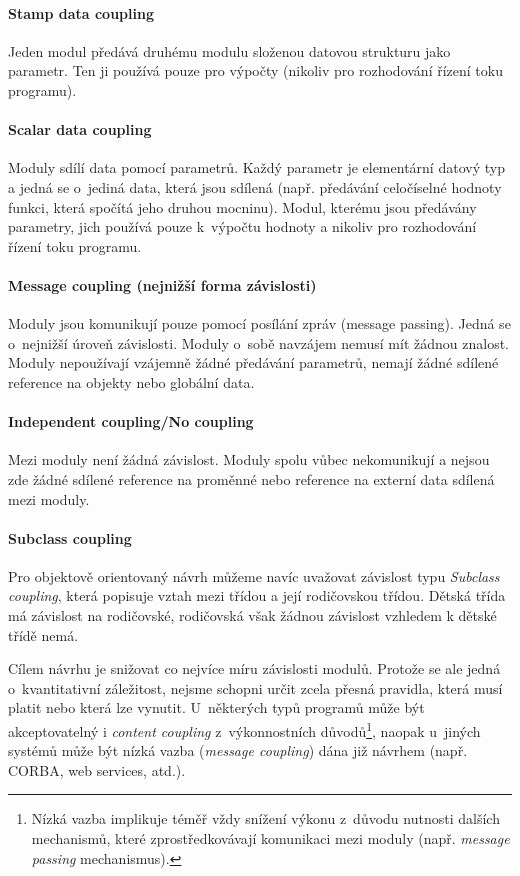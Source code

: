 \paragraph{Stamp data coupling} Jeden modul předává druhému modulu složenou datovou strukturu jako parametr. Ten ji používá pouze pro výpočty (nikoliv pro rozhodování řízení toku programu).

\paragraph{Scalar data coupling} Moduly sdílí data pomocí parametrů. Každý parametr je elementární datový typ a jedná se o~jediná data, která jsou sdílená (např. předávání celočíselné hodnoty funkci, která spočítá jeho druhou mocninu). Modul, kterému jsou předávány parametry, jich používá pouze k~výpočtu hodnoty a nikoliv pro rozhodování řízení toku programu.

\paragraph{Message coupling (nejnižší forma závislosti)} Moduly jsou komunikují pouze pomocí posílání zpráv (message passing). Jedná se o~nejnižší úroveň závislosti. Moduly o~sobě navzájem nemusí mít žádnou znalost. Moduly nepoužívají vzájemně žádné předávání parametrů, nemají žádné sdílené reference na objekty nebo globální data.

\paragraph{Independent coupling/No coupling} Mezi moduly není žádná závislost. Moduly spolu vůbec nekomunikují a nejsou zde žádné sdílené reference na proměnné nebo reference na externí data sdílená mezi moduly.

\vspace{0.5cm}

\paragraph{Subclass coupling} Pro objektově orientovaný návrh můžeme navíc uvažovat závislost typu \emph{Subclass coupling}, která popisuje vztah mezi třídou a její rodičovskou třídou. Dětská třída má závislost na rodičovské, rodičovská však žádnou závislost vzhledem k dětské třídě nemá.

\vspace{1.0cm}

Cílem návrhu je snižovat co nejvíce míru závislosti modulů. Protože se ale jedná o~kvantitativní záležitost, nejsme schopni určit zcela přesná pravidla, která musí platit nebo která lze vynutit. U~některých typů programů může být akceptovatelný i \emph{content coupling} z~výkonnostních důvodů\footnote{Nízká vazba implikuje téměř vždy snížení výkonu z~důvodu nutnosti dalších mechanismů, které zprostředkovávají komunikaci mezi moduly (např. \emph{message passing} mechanismus).}, naopak u~jiných systémů může být nízká vazba (\emph{message coupling}) dána již návrhem (např. CORBA, web services, atd.).


